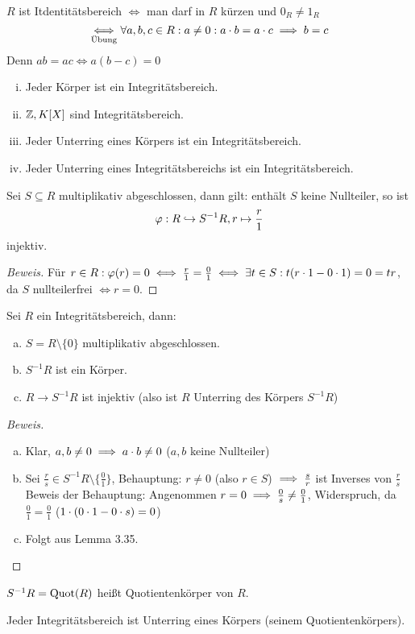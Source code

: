 \documentclass[a4paper]{report}
\begin{document}
\begin{bem}
  $R$ ist Itdentitätsbereich $\iff$ man darf in $R$ kürzen und $0_{R} \ne 1_{R}$
  \[\ueb \iff \forall a, b, c \in R : a \ne 0 : a\cd b = a\cd c \imp b = c\]
  Denn $ab = ac \iff a(b-c) = 0$
\end{bem}
\begin{bsp*}
\begin{enumerate}[(i)]
  \item Jeder Körper ist ein Integritätsbereich.
  \item $\Z, K[X]$ sind Integritätsbereich.
  \item Jeder Unterring eines Körpers ist ein Integritätsbereich.
  \item Jeder Unterring eines Integritätsbereichs ist ein Integritätsbereich.
\end{enumerate}
\end{bsp*}

\begin{lemm}
  Sei $S \subseteq R$ multiplikativ abgeschlossen, dann gilt: enthält $S$ keine Nullteiler, so ist \[\ph : R \hookrightarrow S^{-1}R, r \mps \frac r1\] injektiv.
  \begin{proof}[Beweis]
    Für $r \in R: \ph(r) = 0 \iff \frac r1 = \frac 01 \iff \ex t \in S : t(r \cd 1 - 0\cd 1) = 0 = tr$, da $S$ nullteilerfrei $\iff r = 0.$
  \end{proof}
\end{lemm}

\begin{kor}
  Sei $R$ ein Integritätsbereich, dann:
  \begin{enumerate}[(a)]
    \item $S = R \setminus \{0\}$ multiplikativ abgeschlossen.
    \item $S^{-1}R$ ist ein Körper.
    \item $R \to S^{-1}R$ ist injektiv (also ist $R$ Unterring des Körpers $S^{-1}R$)
  \end{enumerate}
\begin{proof}[Beweis]
  \begin{enumerate}[(a)]
    \item Klar, $a,b \ne 0 \imp a\cd b \ne 0$ ($a,b$ keine Nullteiler)
    \item Sei $\frac rs \in S^{-1}R \setminus \{\frac 01\}$, Behauptung: $r \ne 0$ (also $r \in S$) $\imp \frac sr$ ist Inverses von $\frac rs$
          Beweis der Behauptung: Angenommen $r = 0 \imp \frac 0s \ne \frac 01$, Widerspruch, da $\frac 01 = \frac 01$ ($1 \cd(0\cd1 - 0 \cd s) = 0$)
    \item Folgt aus Lemma 3.35.
  \end{enumerate}

\end{proof}
\end{kor}

\begin{defi}[Quotientenkörper]
$S^{-1}R = \Quot(R)$ heißt Quotientenkörper von $R$.
\end{defi}

\begin{bem}
Jeder Integritätsbereich ist Unterring eines Körpers (seinem Quotientenkörpers).
\end{bem}
\end{document}
